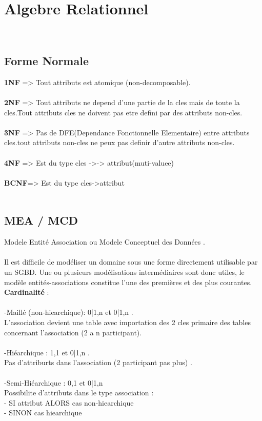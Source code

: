 \documentclass[a4paper,12pt,openany]{book}
\begin{document}

\chapter{Algebre Relationnel}
\\
\section{Forme Normale}
\textbf{1NF} => Tout attributs est atomique (non-decomposable).\\
\\
\textbf{2NF} => Tout attributs ne depend d'une partie de la cles mais de toute la cles.Tout attributs cles ne doivent pas etre defini par des attributs non-cles.\\
\\
\textbf{3NF} => Pas de DFE(Dependance Fonctionnelle Elementaire) entre attributs cles.tout attributs non-cles ne peux pas definir d'autre attributs non-cles.\\
\\
\textbf{4NF} => Est du type cles ->-> attribut(muti-valuee)\\
\\
\textbf{BCNF}=> Est du type cles->attribut\\
\\

\section{MEA / MCD}
Modele Entité Association ou Modele Conceptuel des Données .\\
\\
Il est difficile de modéliser un domaine sous une forme directement utilisable par un SGBD. Une ou plusieurs modélisations intermédiaires sont donc utiles, le modèle entités-associations constitue l'une des premières et des plus courantes.
\\
\textbf{Cardinalité} : \\
\\
-Maillé (non-hiearchique): 0|1,n et 0|1,n .\\
L'association devient une table avec importation des 2 cles primaire des tables concernant l'association (2 a n participant).\\
\\
-Hiéarchique : 1,1 et 0|1,n .\\
Pas d'attriburts dans l'association (2 participant pas plus) .\\
\\
-Semi-Hiéarchique : 0,1 et 0|1,n\\
Possibilite d'attributs dans le type association : \\
	- SI attribut ALORS cas non-hiearchique  \\
	- SINON cas hiearchique \\
\end{document}
